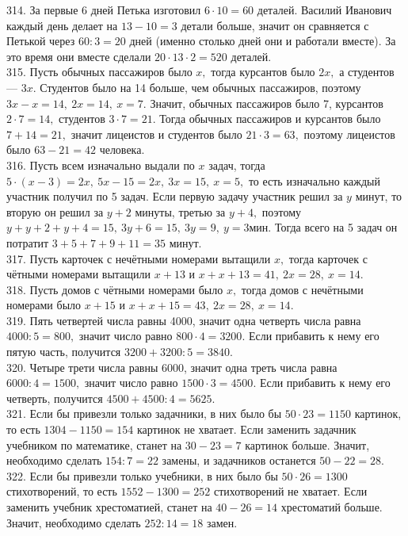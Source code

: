 \documentclass[12pt]{article}
\begin{document}
314. За первые 6 дней Петька изготовил $6\cdot10=60$ деталей. Василий Иванович каждый день делает на $13-10=3$ детали больше, значит он сравняется с Петькой через $60:3=20$ дней (именно столько дней они и работали вместе). За это время они вместе сделали $20\cdot13\cdot2=520$ деталей.\\
315. Пусть обычных пассажиров было $x,$ тогда курсантов было $2x,$ а студентов --- $3x.$ Студентов было на 14 больше, чем обычных пассажиров, поэтому $3x-x=14,\ 2x=14,\ x=7.$ Значит, обычных пассажиров было 7, курсантов $2\cdot7=14,$ студентов $3\cdot7=21.$ Тогда обычных пассажиров и курсантов было $7+14=21,$ значит лицеистов и студентов было $21\cdot3=63,$ поэтому лицеистов было $63-21=42$ человека.\\
316. Пусть всем изначально выдали по $x$ задач, тогда $5\cdot(x-3)=2x,\ 5x-15=2x,\ 3x=15,\ x=5,$ то есть изначально каждый участник получил по 5 задач. Если первую задачу участник решил за $y$ минут, то вторую он решил за $y+2$ минуты, третью за $y+4,$ поэтому $y+y+2+y+4=15,\ 3y+6=15,\ 3y=9,\ y=3$мин. Тогда всего на 5 задач он потратит $3+5+7+9+11=35$ минут.\\
317. Пусть карточек с нечётными номерами вытащили $x,$ тогда карточек с чётными номерами вытащили $x+13$ и $x+x+13=41,\ 2x=28,\ x=14.$\\
318. Пусть домов с чётными номерами было $x,$ тогда домов с нечётными номерами было $x+15$ и $x+x+15=43,\ 2x=28,\ x=14.$\\
319. Пять четвертей числа равны 4000, значит одна четверть числа равна $4000:5=800,$ значит число равно $800\cdot4=3200.$ Если прибавить к нему его пятую часть, получится $3200+3200:5=3840.$\\
320. Четыре трети числа равны 6000, значит одна треть числа равна $6000:4=1500,$ значит число равно $1500\cdot3=4500.$ Если прибавить к нему его четверть, получится $4500+4500:4=5625.$\\
321. Если бы привезли только задачники, в них было бы $50\cdot23=1150$ картинок, то есть $1304-1150=154$ картинок не хватает. Если заменить задачник учебником по математике, станет на $30-23=7$ картинок больше. Значит, необходимо сделать $154:7=22$ замены, и задачников останется $50-22=28.$\\
322. Если бы привезли только учебники, в них было бы $50\cdot26=1300$ стихотворений, то есть $1552-1300=252$ стихотворений не хватает. Если заменить учебник хрестоматией, станет на $40-26=14$ хрестоматий больше. Значит, необходимо сделать $252:14=18$ замен.\\
\end{document}
